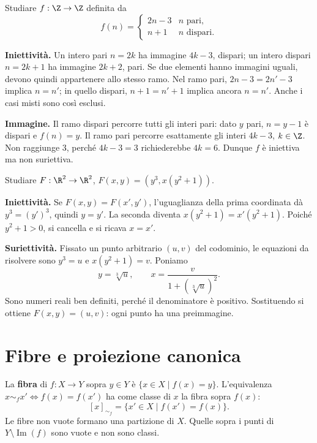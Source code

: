 \begin{esercizio}
Studiare $f:\Z\to\Z$ definita da
\[
f(n)=\begin{cases}2n-3&n\text{ pari},\\n+1&n\text{ dispari}.\end{cases}
\]
\end{esercizio}
\begin{svolgimento}
\textbf{Iniettività.} Un intero pari $n=2k$ ha immagine $4k-3$, dispari; un intero dispari $n=2k+1$ ha immagine $2k+2$, pari. Se due elementi hanno immagini uguali, devono quindi appartenere allo stesso ramo. Nel ramo pari, $2n-3=2n'-3$ implica $n=n'$; in quello dispari, $n+1=n'+1$ implica ancora $n=n'$. Anche i casi misti sono così esclusi.

\textbf{Immagine.} Il ramo dispari percorre tutti gli interi pari: dato $y$ pari, $n=y-1$ è dispari e $f(n)=y$. Il ramo pari percorre esattamente gli interi $4k-3$, $k\in\Z$. Non raggiunge $3$, perché $4k-3=3$ richiederebbe $4k=6$. Dunque $f$ è iniettiva ma non suriettiva.
\end{svolgimento}

\begin{esercizio}
Studiare $F:\R^2\to\R^2$, $F(x,y)=(y^3,x(y^2+1))$.
\end{esercizio}
\begin{svolgimento}
\textbf{Iniettività.} Se $F(x,y)=F(x',y')$, l'uguaglianza della prima coordinata dà $y^3=(y')^3$, quindi $y=y'$. La seconda diventa $x(y^2+1)=x'(y^2+1)$. Poiché $y^2+1>0$, si cancella e si ricava $x=x'$.

\textbf{Suriettività.} Fissato un punto arbitrario $(u,v)$ del codominio, le equazioni da risolvere sono $y^3=u$ e $x(y^2+1)=v$. Poniamo
\[
y=\sqrt[3]u,\qquad x=\frac{v}{1+(\sqrt[3]u)^2}.
\]
Sono numeri reali ben definiti, perché il denominatore è positivo. Sostituendo si ottiene $F(x,y)=(u,v)$: ogni punto ha una preimmagine.
\end{svolgimento}

\section{Fibre e proiezione canonica}
\begin{definizione}
La \textbf{fibra} di $f:X\to Y$ sopra $y\in Y$ è $\{x\in X\mid f(x)=y\}$. L'equivalenza $x\sim_f x'\iff f(x)=f(x')$ ha come classe di $x$ la fibra sopra $f(x)$:
\[
[x]_{\sim_f}=\{x'\in X\mid f(x')=f(x)\}.
\]
Le fibre non vuote formano una partizione di $X$. Quelle sopra i punti di $Y\setminus\operatorname{Im}(f)$ sono vuote e non sono classi.
\end{definizione}

